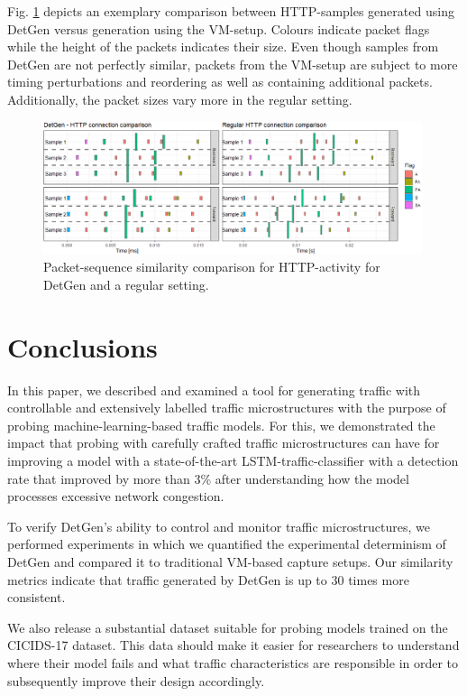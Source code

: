 \documentclass[runningheads]{llncs}
\begin{document}
Fig. \ref{Fig:HTTP-seq} depicts an exemplary comparison between HTTP-samples generated using DetGen versus generation using the VM-setup. Colours indicate packet flags while the height of the packets indicates their size. Even though samples from DetGen are not perfectly similar, packets from the VM-setup are subject to more timing perturbations and reordering as well as containing additional packets. Additionally, the packet sizes vary more in the regular setting.

\begin{figure}
\centering
\includegraphics[width=0.99\textwidth]{images/Detgen_Reg_HTTP_comp_crop.png}
\caption{Packet-sequence similarity comparison for HTTP-activity for DetGen and a regular setting.}\label{Fig:HTTP-seq}
\end{figure}



\section{Conclusions}\label{Sec:Conclusion}

In this paper, we described and examined a tool for generating traffic with controllable and extensively labelled traffic microstructures with the purpose of probing machine-learning-based traffic models. For this, we demonstrated the impact that probing with carefully crafted traffic microstructures can have for improving a model with a state-of-the-art LSTM-traffic-classifier with a detection rate that improved by more than 3\% after understanding how the model processes excessive network congestion. 

To verify DetGen's ability to control and monitor traffic microstructures, we performed experiments in which we quantified the experimental determinism of DetGen and compared it to traditional VM-based capture setups. Our similarity metrics indicate that traffic generated by DetGen is up to 30 times more consistent.

We also release a substantial dataset suitable for probing models trained on the CICIDS-17 dataset. This data should make it easier for researchers to understand where their model fails and what traffic characteristics are responsible in order to subsequently improve their design accordingly.
\end{document}
